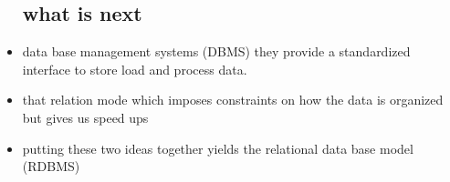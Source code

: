 \documentclass{article}
\begin{document}
\begin{itemize}
\subsection*{what is next}
\item data base management systems (DBMS) they provide a standardized interface to store load and process data. 
\item that relation mode which imposes constraints on how the data is organized but gives us speed ups 
\item putting these two ideas together yields the relational data base model (RDBMS)
\end{itemize}
\end{document}

